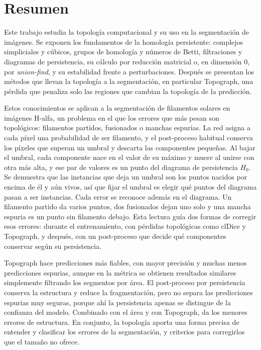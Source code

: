 
\chapter*{Resumen}
\enlargethispage{3\baselineskip}

Este trabajo estudia la topología computacional y su uso en la
segmentación de imágenes. Se exponen los fundamentos de la homología persistente:
complejos simpliciales y cúbicos, grupos de homología y números de
Betti, filtraciones y diagramas de persistencia, su cálculo por
reducción matricial o, en dimensión $0$, por \emph{union-find}, y su
estabilidad frente a perturbaciones. Después se
presentan los métodos que llevan la topología a la segmentación, en
particular Topograph, una pérdida que penaliza solo las regiones que
cambian la topología de la predicción.

Estos conocimientos se aplican a la segmentación de filamentos solares
en imágenes H-alfa, un problema en el que los errores que más pesan son
topológicos: filamentos partidos, fusionados o manchas espurias. La red asigna a
cada píxel una probabilidad de ser filamento, y el post-proceso
habitual conserva los píxeles que superan un umbral y descarta las
componentes pequeñas. Al bajar el umbral, cada componente nace en el
valor de su máximo y muere al unirse con otra más alta, y ese par de
valores es un punto del diagrama de persistencia $H_0$. Se demuestra
que las instancias que deja un umbral son los puntos nacidos por encima
de él y aún vivos, así que fijar el umbral es elegir qué puntos del
diagrama pasan a ser instancias. Cada error se reconoce
además en el diagrama. Un filamento partido da varios puntos, dos
fusionados dejan uno solo y una mancha espuria es un punto sin
filamento debajo. Esta lectura
guía dos formas de corregir esos errores: durante el entrenamiento, con
pérdidas topológicas como clDice y Topograph, y después, con un
post-proceso que decide qué componentes conservar según su persistencia.

Topograph hace predicciones más fiables, con mayor precisión y muchas
menos predicciones espurias, aunque en la métrica se obtienen
resultados similares simplemente filtrando los segmentos por área. El post-proceso por
persistencia conserva la estructura y reduce la fragmentación, pero no
separa las predicciones espurias muy seguras, porque ahí la
persistencia apenas se distingue de la confianza del modelo. Combinado con el área y con
Topograph, da los menores errores de estructura.
En conjunto, la topología aporta
una forma precisa de entender y clasificar los errores de la
segmentación, y criterios para corregirlos que el tamaño no
ofrece.

